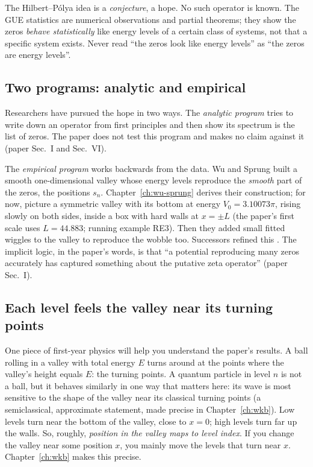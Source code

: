 \begin{pitfall}
The Hilbert--P\'olya idea is a \emph{conjecture}, a hope. No such operator is known. The GUE statistics are numerical observations and partial theorems; they show the zeros \emph{behave statistically} like energy levels of a certain class of systems, not that a specific system exists. Never read ``the zeros look like energy levels'' as ``the zeros are energy levels''.
\end{pitfall}

\subsection{Two programs: analytic and empirical}

Researchers have pursued the hope in two ways. The \emph{analytic program} tries to write down an operator from first principles and then show its spectrum is the list of zeros. The paper does not test this program and makes no claim against it (paper Sec.~I and Sec.~VI).

The \emph{empirical program} works backwards from the data. Wu and Sprung \cite{wusprung} built a smooth one-dimensional valley whose energy levels reproduce the \emph{smooth} part of the zeros, the positions $s_n$. Chapter~\ref{ch:wu-sprung} derives their construction; for now, picture a symmetric valley with its bottom at energy $V_0 = 3.10073\pi$, rising slowly on both sides, inside a box with hard walls at $x = \pm L$ (the paper's first scale uses $L = 44.883$; running example RE3). Then they added small fitted wiggles to the valley to reproduce the wobble too. Successors refined this \cite{vanzyl,slater,jaksch}. The implicit logic, in the paper's words, is that ``a potential reproducing many zeros accurately has captured something about the putative zeta operator'' (paper Sec.~I).

\subsection{Each level feels the valley near its turning points}

One piece of first-year physics will help you understand the paper's results. A ball rolling in a valley with total energy $E$ turns around at the points where the valley's height equals $E$: the turning points. A quantum particle in level $n$ is not a ball, but it behaves similarly in one way that matters here: its wave is most sensitive to the shape of the valley near its classical turning points (a semiclassical, approximate statement, made precise in Chapter~\ref{ch:wkb}). Low levels turn near the bottom of the valley, close to $x=0$; high levels turn far up the walls. So, roughly, \emph{position in the valley maps to level index}. If you change the valley near some position $x$, you mainly move the levels that turn near $x$. Chapter~\ref{ch:wkb} makes this precise.


